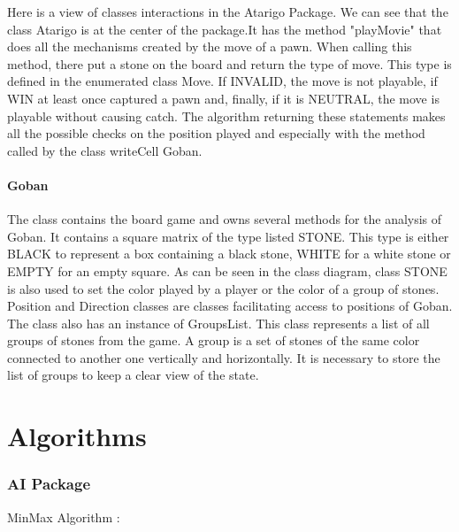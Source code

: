 \documentclass[11pt,a4paper]{report}
\begin{document}
    Here is a view of classes interactions in the Atarigo Package. We can see that the class Atarigo is at the center of the package.It has the method "playMovie" that does all the mechanisms created by the move of a pawn.
    When calling this method, there put a stone on the board and return the type of move. This type is defined in the enumerated class Move. If INVALID, the move is not playable, if WIN at least once captured a pawn and, finally, if it is NEUTRAL, the move is playable without causing catch.
The algorithm returning these statements makes all the possible checks on the position played and especially with the method called by the class writeCell Goban.

\subsubsection*{Goban}


	The class contains the board game and owns several methods for the analysis of Goban. It contains a square matrix of the type listed STONE. This type is either BLACK to represent a box containing a black stone, WHITE for a white stone or EMPTY for an empty square. As can be seen in the class diagram, class STONE is also used to set the color played by a player or the color of a group of stones.\\

Position and Direction classes are classes facilitating access to positions of Goban.\\

    The class also has an instance of GroupsList. This class represents a list of all groups of stones from the game. A group is a set of stones of the same color connected to another one vertically and horizontally. It is necessary to store the list of groups to keep a clear view of the state.


\chapter*{Algorithms}

\subsection*{AI Package}


MinMax Algorithm : \\
\end{document}
